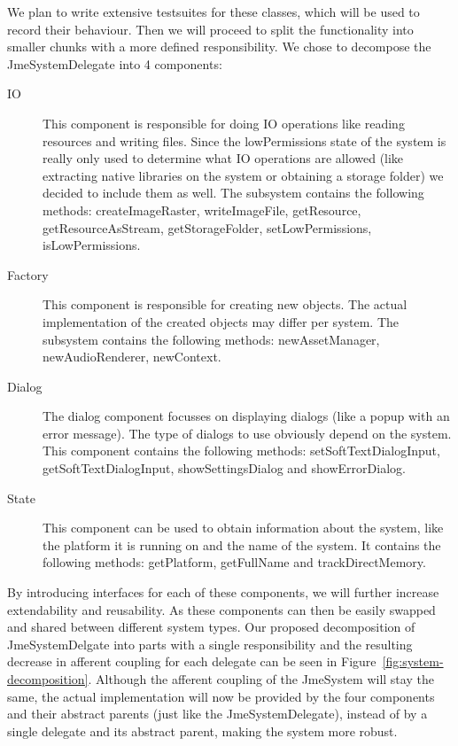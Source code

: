 \documentclass[a4paper, 10pt]{article}
\begin{document}
	We plan to write extensive testsuites for these classes, which will be used to record their behaviour.
	Then we will proceed to split the functionality into smaller chunks with a more defined responsibility.
	We chose to decompose the JmeSystemDelegate into 4 components:
	\begin{description}
		\item[IO] This component is responsible for doing IO operations like reading resources and writing files.
			Since the lowPermissions state of the system is really only used to determine what IO operations are allowed
			(like extracting native libraries on the system or obtaining a storage folder) we decided to include them as well.
			The subsystem contains the following methods: createImageRaster, writeImageFile, getResource, getResourceAsStream, getStorageFolder, setLowPermissions, isLowPermissions.
		\item[Factory] This component is responsible for creating new objects. 
		The actual implementation of the created objects may differ per system.
		The subsystem contains the following methods: newAssetManager, newAudioRenderer, newContext.
		\item[Dialog] The dialog component focusses on displaying dialogs (like a popup with an error message).
		The type of dialogs to use obviously depend on the system.
		This component contains the following methods: setSoftTextDialogInput, getSoftTextDialogInput, showSettingsDialog and showErrorDialog.
		\item[State] This component can be used to obtain information about the system, like the platform it is running on and the name of the system.
		It contains the following methods: getPlatform, getFullName and trackDirectMemory.
	\end{description}

	By introducing interfaces for each of these components, we will further increase extendability and reusability.
	As these components can then be easily swapped and shared between different system types.
	Our proposed decomposition of JmeSystemDelgate into parts with a single responsibility and the resulting decrease in afferent coupling for each delegate
	can be seen in Figure~\ref{fig:system-decomposition}.
	Although the afferent coupling of the JmeSystem will stay the same, 
	the actual implementation will now be provided by the four components and their abstract parents (just like the JmeSystemDelegate),
	instead of by a single delegate and its abstract parent, making the system more robust.
\end{document}
